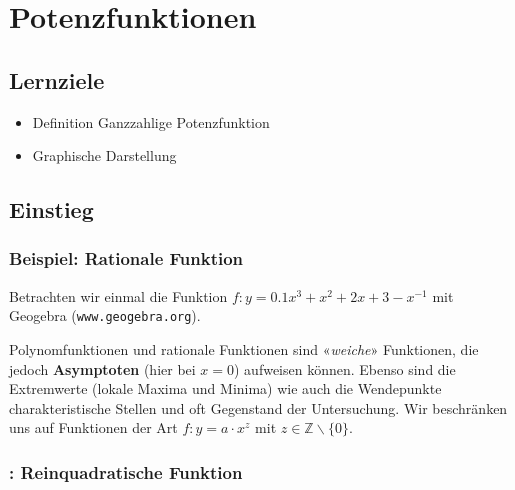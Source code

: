 \section{Potenzfunktionen}

\subsection*{Lernziele}

\begin{itemize}
\item Definition Ganzzahlige Potenzfunktion
\item Graphische Darstellung
\end{itemize}
\newpage


\subsection{Einstieg}

\subsubsection{Beispiel: Rationale Funktion}

Betrachten wir einmal die Funktion $f: y = 0.1x^3 + x^2 + 2x + 3 - x^{-1}$ \zB mit Geogebra (\texttt{www.geogebra.org}).



Polynomfunktionen und rationale Funktionen sind «\textit{weiche}» Funktionen, die jedoch \textbf{Asymptoten} (hier bei $x=0$) aufweisen können.
Ebenso sind die Extremwerte (lokale Maxima und Minima) wie auch die Wendepunkte charakteristische Stellen und oft Gegenstand der Untersuchung.
Wir beschränken uns auf Funktionen der Art $f: y=a\cdot{}x^z$
mit $z \in \mathbb{Z}\backslash\{0\}$.

\newpage



\subsubsection{: Reinquadratische Funktion}

